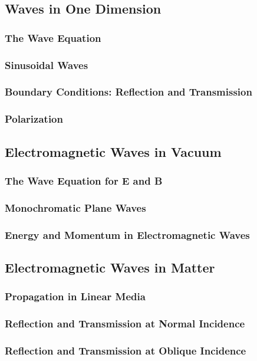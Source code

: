 \documentclass[11pt,a4paper]{article}
\begin{document}
\subsection{Waves in One Dimension}
\subsubsection{The Wave Equation}
\subsubsection{Sinusoidal Waves}
\subsubsection{Boundary Conditions: Reflection and Transmission}
\subsubsection{Polarization}
\subsection{Electromagnetic Waves in Vacuum}
\subsubsection{The Wave Equation for E and B}
\subsubsection{Monochromatic Plane Waves}
\subsubsection{Energy and Momentum in Electromagnetic Waves}
\subsection{Electromagnetic Waves in Matter}
\subsubsection{Propagation in Linear Media}
\subsubsection{Reflection and Transmission at Normal Incidence}
\subsubsection{Reflection and Transmission at Oblique Incidence}
\end{document}

